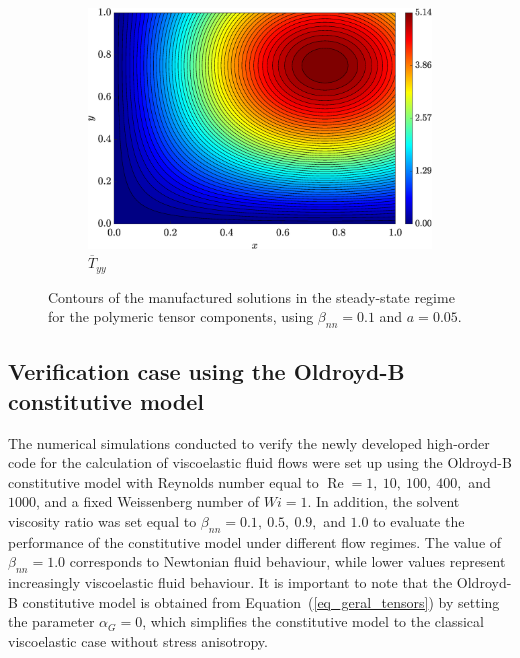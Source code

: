 \documentclass[preprint, 12pt]{elsarticle}
\begin{document}
\begin{figure}[H]
    \begin{subfigure}[b]{.46\textwidth}
        \includegraphics[width=\textwidth]{Exact_Map_NormErr_2nd_Betann_0.1_Re_1_Wi_1_epsilon_0_xi_0_alphaG_0_Dt_1e-06_at_0.05_tipsim_1_MMS_12_Tyy.eps}
        \caption{$\overline{T}_{yy}$}
        \label{fig_solexatyystreamlineCase1}
    \end{subfigure}
    \vspace{0.02cm}
    \caption{Contours of the manufactured solutions in the steady-state regime for the polymeric tensor components, using $\beta_{nn}=0.1$ and $a = 0.05$.\label{fig_Txxxyyy_m_u_sol_num_case1streamline2}}
\end{figure}

\subsection{Verification case using the Oldroyd-B constitutive model}
\label{subsec_oldroydb}

The numerical simulations conducted to verify the newly developed high-order
code for the calculation of viscoelastic fluid flows were set up using the
Oldroyd-B constitutive model with Reynolds number equal to
$\operatorname{Re}=1,\ 10,\ 100,\ 400,$ and $1000$, and a fixed Weissenberg
number of $Wi=1$. In addition, the solvent viscosity ratio was set equal to
$\beta_{nn} = 0.1,\ 0.5,\ 0.9,$ and $1.0$ to evaluate the performance of the
constitutive model under different flow regimes. The value of $\beta_{nn} =
1.0$ corresponds to Newtonian fluid behaviour, while lower values represent
increasingly viscoelastic fluid behaviour. It is important to note that the
Oldroyd-B constitutive model is obtained from Equation~(\ref{eq_geral_tensors})
by setting the parameter $\alpha_{G} = 0$, which simplifies the constitutive
model to the classical viscoelastic case without stress anisotropy.
\end{document}
